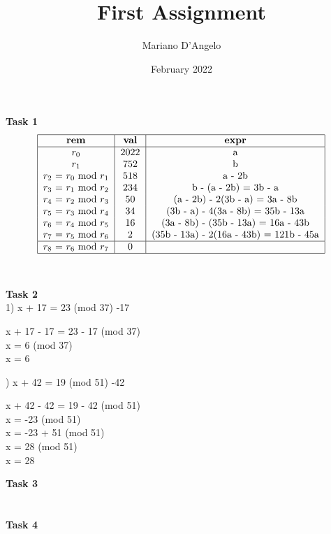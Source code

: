 \documentclass[12pt]{article}
\title{First Assignment}
\author{Mariano D'Angelo}
\date{February 2022}
\begin{document}
\maketitle

\noindent \textbf{Task 1}
\begin{equation}
\begin{tabular}{ | c | c | c | } \hline
    \textbf{rem} & \textbf{val} & \textbf{expr} \\ \hline
    $r_0$ & 2022 & a \\
    $r_1$ & 752 & b \\
    $r_2$ = $r_0$ mod $r_1$ & 518 & a - 2b \\
    $r_3$ = $r_1$ mod $r_2$ & 234 & b - (a - 2b) = 3b - a \\
    $r_4$ = $r_2$ mod $r_3$ & 50 & (a - 2b) - 2(3b - a) = 3a - 8b \\
    $r_5$ = $r_3$ mod $r_4$ & 34 & (3b - a) - 4(3a - 8b) = 35b - 13a \\
    $r_6$ = $r_4$ mod $r_5$ & 16 & (3a - 8b) - (35b - 13a) = 16a - 43b \\
    $r_7$ = $r_5$ mod $r_6$ & 2 & (35b - 13a) - 2(16a - 43b) = 121b - 45a \\ \hline
    $r_8$ = $r_6$ mod $r_7$ & 0 & \\ \hline
\end{tabular}
\end{equation}
\\\\
\textbf{Task 2} \\
1) x + 17 = 23 (mod 37) \textbar{} -17
\begin{addmargin}[1.2em]{0em}
   x + 17 - 17 = 23 - 17 (mod 37) \\
   x = 6 (mod 37) \\
   x = 6\\
\end{addmargin}
) x + 42 = 19 (mod 51) \textbar{} -42 
\begin{addmargin}[1.2em]{0em}
   x + 42 - 42 = 19 - 42 (mod 51) \\
   x = -23 (mod 51) \\
   x = -23 + 51 (mod 51) \\   
   x = 28 (mod 51) \\
   x = 28 \\
\end{addmargin}

\textbf{Task 3} \\
\\\\

\textbf{Task 4}
\end{document}
